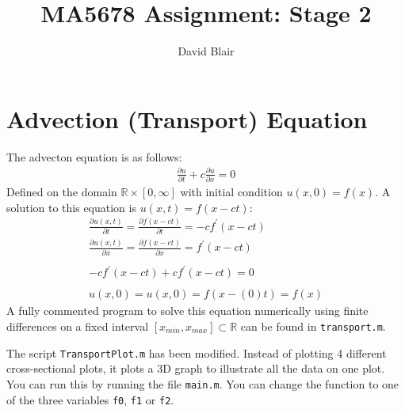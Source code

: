 \documentclass[]{report}
\title{MA5678 Assignment: Stage 2}
\author{David Blair}
\newcommand{\real}{\mathbb{R}}
\def\incode#1{\texttt{#1}}
\begin{document}
	\maketitle
	
	\section{Advection (Transport) Equation}
	The advecton equation is as follows:
	\begin{align}
		\frac{\partial u}{\partial t} + c \frac{\partial u}{\partial x} = 0
	\end{align}
	Defined on the domain $ \real \times [0, \infty] $ with initial condition $ u(x, 0) = f(x) $. A solution to this equation is $ u(x, t) = f(x - ct) $:
	\begin{align}
		\frac{\partial u(x, t)}{\partial t} = \frac{\partial f(x - ct)}{\partial t} = -c f^\prime(x - ct) \nonumber \\
		\frac{\partial u(x, t)}{\partial x} = \frac{\partial f(x - ct)}{\partial x} = f^\prime(x - ct) \nonumber \\ \nonumber \\
		-c f^\prime(x - ct) + cf^\prime(x - ct) = 0 \nonumber \\ \nonumber \\ \nonumber 
		u(x, 0) = u(x, 0) = f(x - (0)t) = f(x)
	\end{align}
	A fully commented program to solve this equation numerically using finite differences on a fixed interval $ [x_{min}, x_{max}] \subset \real$ can be found in \incode{transport.m}.
	
	The script \incode{TransportPlot.m} has been modified. Instead of plotting 4 different cross-sectional plots, it plots a 3D graph to illustrate all the data on one plot. You can run this by running the file \incode{main.m}. You can change the function to one of the three variables \incode{f0}, \incode{f1} or \incode{f2}. 
	
\end{document}
